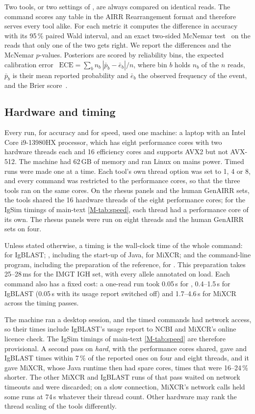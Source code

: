 \documentclass[11pt,a4paper]{article}
\begin{document}
Two tools, or two settings of \swig, are always compared on identical reads.
The command  scores any table in the AIRR Rearrangement
format and therefore serves every tool alike. For each metric it computes
the difference in accuracy with its 95\,\% paired Wald interval, and an
exact two-sided McNemar test~\cite{mcnemar1947} on the reads that only one
of the two gets right. We report the differences and the McNemar
$p$-values. Posteriors are scored by reliability bins, the expected
calibration error~\cite{naeini2015ece}
$\text{ECE}=\sum_b n_b\,|\bar p_b-\bar e_b|/n$, where bin $b$ holds $n_b$ of
the $n$ reads, $\bar p_b$ is their mean reported probability and
$\bar e_b$ the observed frequency of the event, and the Brier
score~\cite{brier1950}.

\subsection{Hardware and timing}
\label{sec:protocol-timing}

Every run, for accuracy and for speed, used one machine: a laptop with an
Intel Core i9-13980HX processor, which has eight performance cores with two
hardware threads each and 16 efficiency cores and supports AVX2 but not
AVX-512. The machine had 62\,GB of memory and ran Linux on mains power.
Timed runs were made one at a time. Each tool's own thread option was set to
1, 4 or 8, and every command was restricted to the performance cores, so
that the three tools ran on the same cores. On the rhesus panels and the
human GenAIRR sets, the tools shared the 16 hardware threads of the eight
performance cores; for the IgSim timings of main-text \cref{M-tab:speed},
each thread had a performance core of its own. The rhesus panels were run on
eight threads and the human GenAIRR sets on four.

Unless stated otherwise, a timing is the wall-clock time of the whole
command:  for IgBLAST; , including the start-up
of Java, for MiXCR; and the command-line program, including the preparation
of the reference, for \swig. This preparation takes 25--28\,ms for the IMGT
IGH set, with every allele annotated on load. Each command also has a fixed
cost: a one-read run took 0.05\,s for \swig, 0.4--1.5\,s for IgBLAST
(0.05\,s with its usage report switched off) and 1.7--4.6\,s for MiXCR
across the timing passes.

The machine ran a desktop session, and the timed commands had network
access, so their times include IgBLAST's usage report to NCBI and MiXCR's
online licence check. The IgSim timings of main-text \cref{M-tab:speed} are
therefore provisional. A second pass on \emph{hard}, with the performance
cores shared, gave \swig{} and IgBLAST times within 7\,\% of the reported
ones on four and eight threads, and it gave MiXCR, whose Java runtime then
had spare cores, times that were 16--24\,\% shorter. The other MiXCR and
IgBLAST runs of that pass waited on network timeouts and were discarded; on
a slow connection, MiXCR's network calls held some runs at 74\,s whatever
their thread count. Other hardware may rank the thread scaling of the tools
differently.
\end{document}
